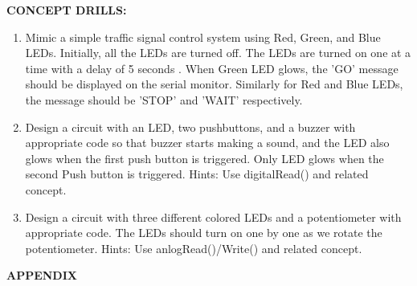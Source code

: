\documentclass[12pt,a4paper]{article}
\begin{document}
\begin{justify}
\noindent \textbf{\large CONCEPT DRILLS:}
\vspace{-3mm}
\begin{enumerate}
 \setlength\itemsep{-0.3em}
\item  Mimic a simple traffic signal control system using Red, Green, and Blue LEDs. Initially, all the LEDs are turned off. The LEDs are turned on one at a time with a delay of 5 seconds . When Green LED glows, the 'GO' message should be displayed on the serial monitor. Similarly for Red and Blue LEDs, the message should be 'STOP' and 'WAIT' respectively.
\item  Design a circuit with an LED, two pushbuttons, and a buzzer with appropriate code so that buzzer starts making a sound, and the LED also glows when the first push button is triggered. Only LED glows when the second Push button is triggered. Hints: Use digitalRead() and related concept.
\item  Design a circuit with three different colored LEDs and a potentiometer with appropriate code. The LEDs should turn on one by one as we rotate the potentiometer. Hints: Use anlogRead()/Write() and related concept.
\end{enumerate}
\vspace{10cm}

\begin{center} \textbf{\large APPENDIX} \end{center}


\end{justify}
\end{document}
